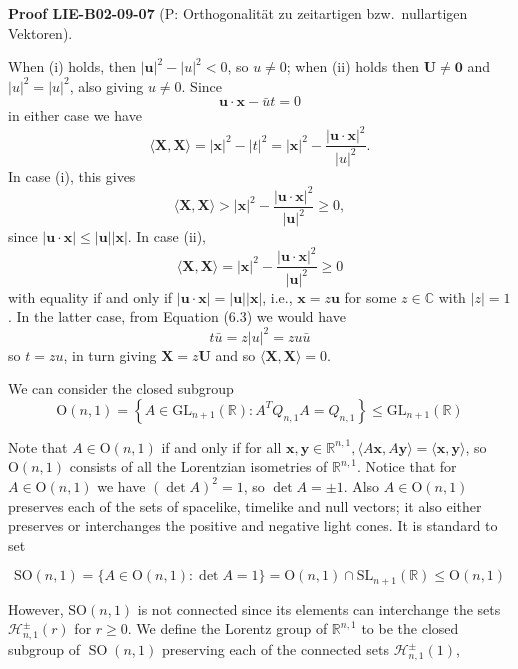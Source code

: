 \documentclass[10pt, letterpaper]{article}
\newcommand{\CustomHeading}[3]{%
  \par\medskip\noindent%
  \textbf{#1 #2} \textnormal{(#3)}.\enskip%
}
\newenvironment{PROOF}[2]{\begin{unitbox}\CustomHeading{Proof}{#1}{#2}}{\end{unitbox}}
\begin{document}
\begin{PROOF}{LIE-B02-09-07}{P: Orthogonalität zu zeitartigen bzw.\ nullartigen Vektoren}
When (i) holds, then $|\mathbf{u}|^{2}-|u|^{2}<0$, so $u \neq 0$; when (ii) holds then $\mathbf{U} \neq \mathbf{0}$ and $|u|^{2}=|u|^{2}$, also giving $u \neq 0$. Since
$$
\mathbf{u} \cdot \mathbf{x}-\bar{u} t=0
$$
in either case we have
$$
\langle\mathbf{X}, \mathbf{X}\rangle=|\mathbf{x}|^{2}-|t|^{2}=|\mathbf{x}|^{2}-\frac{|\mathbf{u} \cdot \mathbf{x}|^{2}}{|u|^{2}} .
$$
In case (i), this gives
$$
\langle\mathbf{X}, \mathbf{X}\rangle>|\mathbf{x}|^{2}-\frac{|\mathbf{u} \cdot \mathbf{x}|^{2}}{|\mathbf{u}|^{2}} \geqslant 0,
$$
since $|\mathbf{u} \cdot \mathbf{x}| \leqslant|\mathbf{u}||\mathbf{x}|$. In case (ii),
$$
\langle\mathbf{X}, \mathbf{X}\rangle=|\mathbf{x}|^{2}-\frac{|\mathbf{u} \cdot \mathbf{x}|^{2}}{|\mathbf{u}|^{2}} \geqslant 0
$$
with equality if and only if $|\mathbf{u} \cdot \mathbf{x}|=|\mathbf{u}||\mathbf{x}|$, i.e., $\mathbf{x}=z \mathbf{u}$ for some $z \in \mathbb{C}$ with $|z|=1$. In the latter case, from Equation (6.3) we would have
$$
t \bar{u}=z|u|^{2}=z u \bar{u}
$$
so $t=z u$, in turn giving $\mathbf{X}=z \mathbf{U}$ and so $\langle\mathbf{X}, \mathbf{X}\rangle=0$.
\end{PROOF}




We can consider the closed subgroup
$$
\mathrm{O}(n, 1)=\left\{A \in \mathrm{GL}_{n+1}(\mathbb{R}): A^{T} Q_{n, 1} A=Q_{n, 1}\right\} \leqslant \mathrm{GL}_{n+1}(\mathbb{R})
$$


Note that $A \in \mathrm{O}(n, 1)$ if and only if for all $\mathbf{x}, \mathbf{y} \in \mathbb{R}^{n, 1},\langle A \mathbf{x}, A \mathbf{y}\rangle=\langle\mathbf{x}, \mathbf{y}\rangle$, so $\mathrm{O}(n, 1)$ consists of all the Lorentzian isometries of $\mathbb{R}^{n, 1}$. Notice that for $A \in \mathrm{O}(n, 1)$ we have $(\operatorname{det} A)^{2}=1$, so $\operatorname{det} A= \pm 1$. Also $A \in \mathrm{O}(n, 1)$ preserves each of the sets of spacelike, timelike and null vectors; it also either preserves or interchanges the positive and negative light cones. It is standard to set

$$
\mathrm{SO}(n, 1)=\{A \in \mathrm{O}(n, 1): \operatorname{det} A=1\}=\mathrm{O}(n, 1) \cap \mathrm{SL}_{n+1}(\mathbb{R}) \leqslant \mathrm{O}(n, 1)
$$

However, $\mathrm{SO}(n, 1)$ is not connected since its elements can interchange the sets $\mathcal{H}_{n, 1}^{ \pm}(r)$ for $r \geqslant 0$. We define the Lorentz group of $\mathbb{R}^{n, 1}$ to be the closed subgroup of $\operatorname{SO}(n, 1)$ preserving each of the connected sets $\mathcal{H}_{n, 1}^{ \pm}(1)$,
\end{document}
